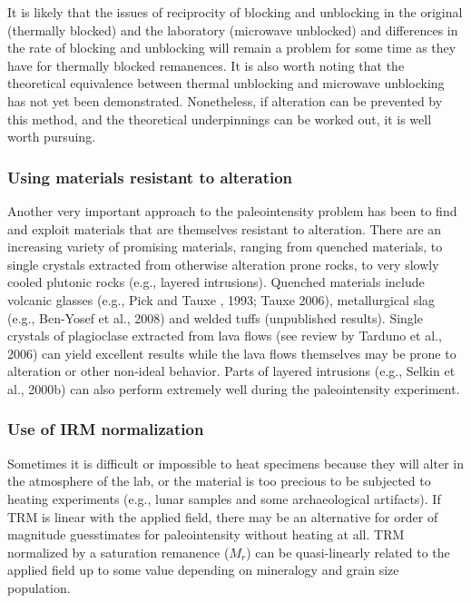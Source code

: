  It is likely that the issues of reciprocity of blocking and unblocking in the original (thermally blocked) and the laboratory (microwave unblocked) and differences in the rate of blocking and unblocking will remain a  problem for some time as they have for thermally blocked remanences.   
It is also worth noting that the
theoretical equivalence between thermal unblocking and microwave unblocking has not yet been demonstrated.    Nonetheless, if alteration can be prevented by this method, and the theoretical underpinnings can be worked out, it is well worth pursuing.
 
\subsubsection{Using materials resistant to alteration}
 
 Another very important approach to the paleointensity problem has been to find and exploit materials that are themselves resistant to alteration.      There are an increasing variety of promising materials, ranging from quenched materials, to single crystals extracted from otherwise alteration prone rocks,  to very slowly cooled plutonic rocks (e.g., layered intrusions).       Quenched materials include volcanic glasses (e.g.,
  Pick and Tauxe , 1993; Tauxe 2006),  metallurgical slag (e.g., 
  Ben-Yosef et al., 2008) and  welded tuffs (unpublished results).    Single crystals of plagioclase extracted from lava flows (see review by 
  Tarduno et al., 2006) \nocite{tarduno06} can yield excellent results while the lava flows themselves may be  prone to alteration or other non-ideal  behavior.    Parts of layered intrusions (e.g., 
 Selkin et al., 2000b) can also perform extremely well during the paleointensity experiment.   \nocite{pick93,tauxe06b,selkin00,tarduno06}    
 

  
\subsubsection{Use of IRM normalization}

  Sometimes it is difficult or impossible to heat specimens because they will alter in the atmosphere of the lab, or the material is too precious to be subjected to heating experiments (e.g., lunar samples and  some archaeological artifacts).   If TRM is linear with the applied field, there may be an alternative for order of magnitude guesstimates for paleointensity without heating at all.  TRM normalized by a saturation remanence ($M_r$) can be  quasi-linearly related to the applied field  up to some value depending on mineralogy and grain size population.    
  
